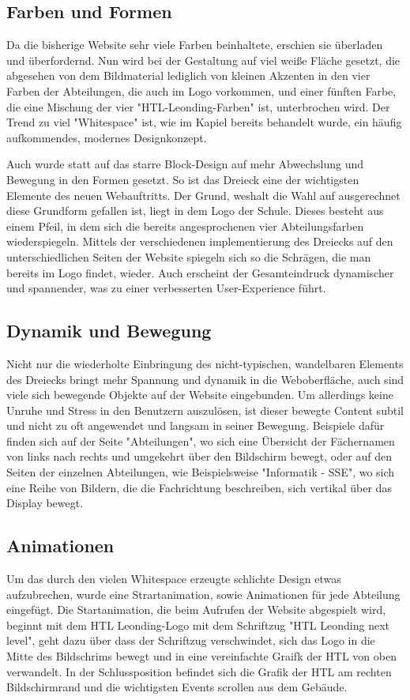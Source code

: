 \subsection{Farben und Formen}

Da die bisherige Website sehr viele Farben beinhaltete, erschien sie überladen und überfordernd.
Nun wird bei der Gestaltung auf viel weiße Fläche gesetzt, die abgesehen von dem Bildmaterial lediglich von kleinen Akzenten 
in den vier Farben der Abteilungen, die auch im Logo vorkommen, und einer fünften Farbe, die eine Mischung der vier 
"HTL-Leonding-Farben" ist, unterbrochen wird. Der Trend zu viel "Whitespace" ist, wie im Kapiel  bereits
behandelt wurde, ein häufig aufkommendes, modernes Designkonzept.

Auch wurde statt auf das starre Block-Design auf mehr Abwechslung und Bewegung in den Formen gesetzt.
So ist das Dreieck eine der wichtigsten Elemente des neuen Webauftritts. Der Grund, weshalt die Wahl 
auf ausgerechnet diese Grundform gefallen ist, liegt in dem Logo der Schule. Dieses besteht aus einem Pfeil,
in dem sich die bereits angesprochenen vier Abteilungsfarben wiederspiegeln. Mittels der verschiedenen
implementierung des Dreiecks auf den unterschiedlichen Seiten der Website spiegeln sich so die Schrägen,
die man bereits im Logo findet, wieder. Auch erscheint der Gesamteindruck
dynamischer und spannender, was zu einer verbesserten User-Experience führt.

\subsection{Dynamik und Bewegung}

Nicht nur die wiederholte Einbringung des nicht-typischen, wandelbaren Elements des Dreiecks
bringt mehr Spannung und dynamik in die Weboberfläche, auch sind viele sich bewegende Objekte auf 
der Website eingebunden. Um allerdings keine Unruhe und Stress in den Benutzern auszulösen, ist dieser
bewegte Content subtil und nicht zu oft angewendet und langsam in seiner Bewegung. Beispiele dafür finden sich 
auf der Seite "Abteilungen", wo sich eine Übersicht der Fächernamen von links nach rechts und umgekehrt
über den Bildschirm bewegt, oder auf den Seiten der einzelnen Abteilungen, wie Beispielsweise "Informatik - SSE", 
wo sich eine Reihe von Bildern, die die Fachrichtung beschreiben, sich vertikal über das Display bewegt.


\subsection{Animationen}

Um das durch den vielen Whitespace erzeugte schlichte Design etwas aufzubrechen, wurde eine Strartanimation,
sowie Animationen für jede Abteilung eingefügt. Die Startanimation, die beim Aufrufen der Website 
abgespielt wird, beginnt mit dem HTL Leonding-Logo mit dem Schriftzug "HTL Leonding next level", geht dazu über dass 
der Schriftzug verschwindet, sich das Logo in die Mitte des Bildschrims bewegt und  in eine vereinfachte Graifk der HTL von oben verwandelt.
In der Schlussposition befindet sich die Grafik der HTL am rechten Bildschirmrand und die 
wichtigsten Events scrollen aus dem Gebäude. 
